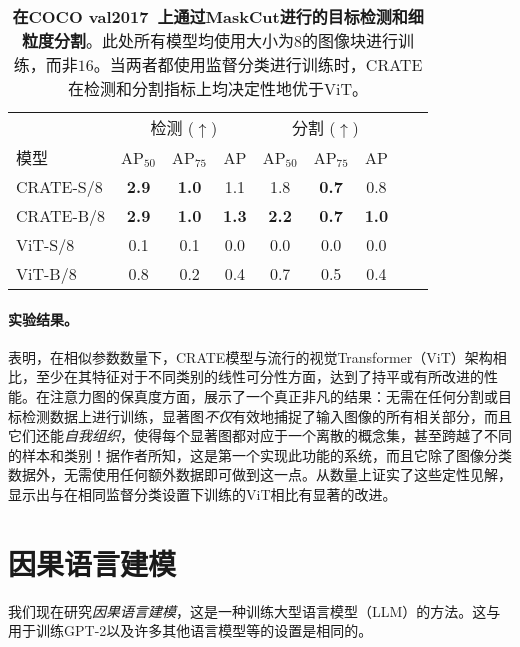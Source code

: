 \documentclass[../../book-main.tex]{subfiles}
\begin{document}
\begin{table}
    \centering
    \begin{tabular}{@{}lcccccccc@{}}
    \toprule
     &  \multicolumn{3}{c}{检测 (\(\uparrow\))} &  \multicolumn{3}{c}{分割 (\(\uparrow\))} \\ 
    模型 & AP$_{50}$ & AP$_{75}$ & AP & AP$_{50}$ & AP$_{75}$ & AP  \\ 
    \midrule
    CRATE-S/8 & \textbf{2.9} & \textbf{1.0} & 1.1 & 1.8 & \textbf{0.7} & 0.8 \\
    CRATE-B/8 & \textbf{2.9} & \textbf{1.0} & \textbf{1.3} & \textbf{2.2} & \textbf{0.7} & \textbf{1.0} \\
    ViT-S/8 & 0.1& 0.1 & 0.0 & 0.0 & 0.0 & 0.0 \\
    ViT-B/8 & 0.8 & 0.2 & 0.4 & 0.7 & 0.5 & 0.4 \\
    \bottomrule
    \end{tabular}
    \caption{\small \textbf{在COCO {val2017}~\citep{lin2014microsoft}上通过MaskCut进行的目标检测和细粒度分割}。此处所有模型均使用大小为\(8\)的图像块进行训练，而非\(16\)。当两者都使用监督分类进行训练时，CRATE在检测和分割指标上均决定性地优于ViT。}
    \label{tab:crate_detection_segmentation}
\end{table}


\paragraph{实验结果。} 

表明，在相似参数数量下，CRATE模型与流行的视觉Transformer（ViT）架构相比，至少在其特征对于不同类别的线性可分性方面，达到了持平或有所改进的性能。在注意力图的保真度方面，展示了一个真正非凡的结果：无需在任何分割或目标检测数据上进行训练，显著图\textit{不仅}有效地捕捉了输入图像的所有相关部分，而且它们还能\textit{自我组织}，使得每个显著图都对应于一个离散的概念集，甚至跨越了不同的样本和类别！据作者所知，这是第一个实现此功能的系统，而且它除了图像分类数据外，无需使用任何额外数据即可做到这一点。从数量上证实了这些定性见解，显示出与在相同监督分类设置下训练的ViT相比有显著的改进。

\section{因果语言建模}\label{sec:clm_text}

我们现在研究\textit{因果语言建模}，这是一种训练大型语言模型（LLM）的方法。这与用于训练GPT-2以及许多其他语言模型等的设置是相同的。
\end{document}
